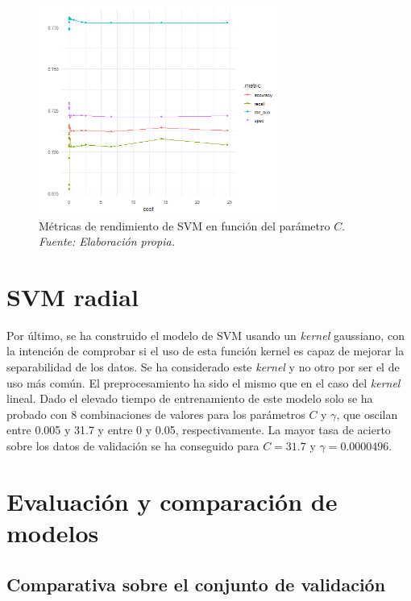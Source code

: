 \documentclass[12pt,a4paper,]{book}
\numberwithin{dummy}{section}
\theoremstyle{ocrenumbox}
\theoremstyle{blacknumex}
\theoremstyle{blacknumbox}
\theoremstyle{ocrenum}
\theoremstyle{ocrenum}
\begin{document}
\begin{figure}[h!]
\centering
\includegraphics[width =0.7\textwidth]{graficos/svm_tuningplot.png}
\caption[Métricas de rendimiento de SVM en función del parámetro $coste$]{Métricas de rendimiento de SVM en función del parámetro $C$. \it Fuente: Elaboración propia.}
\label{fig:svm_tuningplot}
\end{figure}

\hypertarget{svm-radial}{%
\section{SVM radial}\label{svm-radial}}

Por último, se ha construido el modelo de SVM usando un \emph{kernel}
gaussiano, con la intención de comprobar si el uso de esta función
kernel es capaz de mejorar la separabilidad de los datos. Se ha
considerado este \emph{kernel} y no otro por ser el de uso más común. El
preprocesamiento ha sido el mismo que en el caso del \emph{kernel}
lineal. Dado el elevado tiempo de entrenamiento de este modelo solo se
ha probado con 8 combinaciones de valores para los parámetros \(C\) y
\(\gamma\), que oscilan entre 0.005 y 31.7 y entre 0 y 0.05,
respectivamente. La mayor tasa de acierto sobre los datos de validación
se ha conseguido para \(C = 31.7\) y \(\gamma = 0.0000496\).

\hypertarget{evaluaciuxf3n-y-comparaciuxf3n-de-modelos}{%
\section{Evaluación y comparación de
modelos}\label{evaluaciuxf3n-y-comparaciuxf3n-de-modelos}}

\hypertarget{comparativa-sobre-el-conjunto-de-validaciuxf3n}{%
\subsection{Comparativa sobre el conjunto de
validación}\label{comparativa-sobre-el-conjunto-de-validaciuxf3n}}
\end{document}

